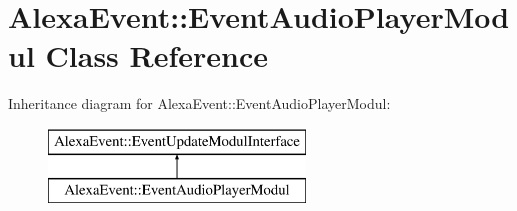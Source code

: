 \hypertarget{classAlexaEvent_1_1EventAudioPlayerModul}{}\section{Alexa\+Event\+:\+:Event\+Audio\+Player\+Modul Class Reference}
\label{classAlexaEvent_1_1EventAudioPlayerModul}
Inheritance diagram for Alexa\+Event\+:\+:Event\+Audio\+Player\+Modul\+:\begin{figure}[H]
\begin{center}
\leavevmode
\includegraphics[height=2.000000cm]{d8/d77/classAlexaEvent_1_1EventAudioPlayerModul}
\end{center}
\end{figure}
